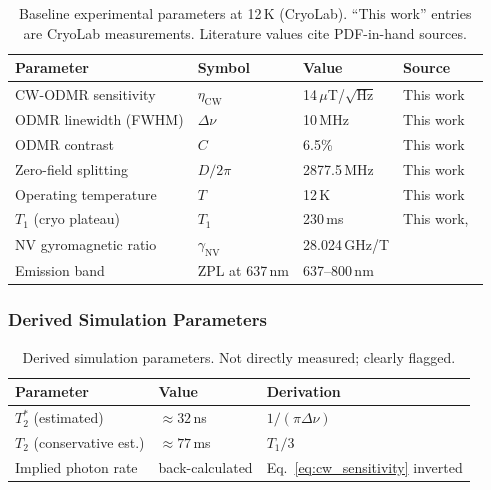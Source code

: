 \begin{table}[ht]
\centering
\caption{Baseline experimental parameters at 12\,K (CryoLab). ``This work'' entries are
  CryoLab measurements. Literature values cite PDF-in-hand sources.}
\label{tab:nv_params}
\small
\begin{tabular}{@{}p{4.5cm}p{2.5cm}p{2cm}p{4cm}@{}}
\toprule
Parameter & Symbol & Value & Source \\
\midrule
CW-ODMR sensitivity & $\eta_\mathrm{CW}$ & 14\,$\mu$T/$\sqrt{\text{Hz}}$ & This work \\
ODMR linewidth (FWHM) & $\Delta\nu$ & 10\,MHz & This work \\
ODMR contrast & $C$ & 6.5\% & This work \\
Zero-field splitting & $D/2\pi$ & 2877.5\,MHz & This work \\
Operating temperature & $T$ & 12\,K & This work \\
$T_1$ (cryo plateau) & $T_1$ & 230\,ms & This work,~\cite{Jarmola2012} \\ %
NV gyromagnetic ratio & $\gamma_\mathrm{NV}$ & 28.024\,GHz/T & \cite{Doherty2013} \\ %
Emission band & ZPL at 637\,nm & 637--800\,nm & \cite{Doherty2013} \\ %
\bottomrule
\end{tabular}
\end{table}

\subsubsection{Derived Simulation Parameters}

\begin{table}[ht]
\centering
\caption{Derived simulation parameters. Not directly measured; clearly flagged.}
\label{tab:derived_params}
\small
\begin{tabular}{@{}p{4.5cm}p{2cm}p{4.5cm}@{}}
\toprule
Parameter & Value & Derivation \\
\midrule
$T_2^*$ (estimated) & $\approx 32$\,ns & $1/(\pi\Delta\nu)$~\cite{Barry2020}
  \\
$T_2$ (conservative est.) & $\approx 77$\,ms & $T_1/3$~\cite{Jarmola2012}
  \\
Implied photon rate & back-calculated & Eq.~\eqref{eq:cw_sensitivity} inverted \\
\bottomrule
\end{tabular}
\end{table}

